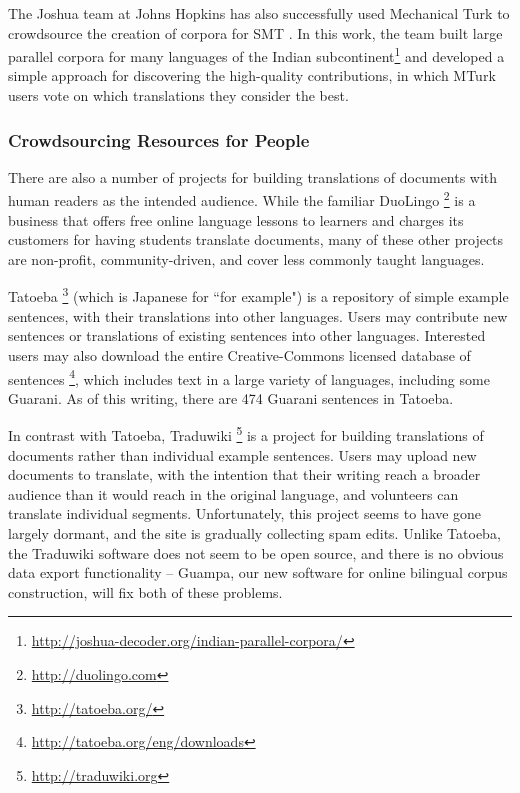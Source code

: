 The Joshua team at Johns Hopkins has also successfully used Mechanical Turk to
crowdsource the creation of corpora for SMT
\cite{post-callisonburch-osborne:2012:WMT}. In this work, the team built
large parallel corpora for many languages of the Indian
subcontinent\footnote{\url{http://joshua-decoder.org/indian-parallel-corpora/}}
and developed a simple approach for discovering the high-quality contributions,
in which MTurk users vote on which translations they consider the best.


\subsubsection{Crowdsourcing Resources for People}

There are also a number of projects for building translations of documents with
human readers as the intended audience.
While the familiar DuoLingo \footnote{\url{http://duolingo.com}} is a business
that offers free online language lessons to learners and charges its customers
for having students translate documents, many of these other projects are
non-profit, community-driven, and cover less commonly taught languages.

Tatoeba \footnote{\url{http://tatoeba.org/}} (which is Japanese for ``for
example") is a repository of simple example sentences, with their translations
into other languages. Users may contribute new sentences or translations of
existing sentences into other languages. Interested users may also download the
entire Creative-Commons licensed database of sentences
\footnote{\url{http://tatoeba.org/eng/downloads}}, which includes text in a
large variety of languages, including some Guarani. As of this writing, there
are 474 Guarani sentences in Tatoeba.

In contrast with Tatoeba, Traduwiki \footnote{\url{http://traduwiki.org}} is a
project for building translations of documents rather than individual example
sentences. Users may upload new documents to translate, with the intention that
their writing reach a broader audience than it would reach in the original
language, and volunteers can translate individual segments. Unfortunately, this
project seems to have gone largely dormant, and the site is gradually
collecting spam edits. Unlike Tatoeba, the Traduwiki software does not seem to
be open source, and there is no obvious data export functionality -- Guampa,
our new software for online bilingual corpus construction, will fix both of
these problems.

